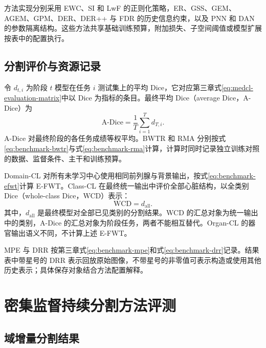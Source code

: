 方法实现分别采用 EWC、SI 和 LwF 的正则化策略\cite{kirkpatrick2017ewc,method_regu_si,li2018lwf}，ER、GSS、GEM、AGEM、GPM、DER、DER++ 与 FDR 的历史信息约束\cite{method_replay_er,method_replay_gss,method_replay_gem,method_replay_agem,saha2021gpm,method_replay_der,method_replay_xder,method_replay_fdr}，以及 PNN 和 DAN 的参数隔离结构\cite{method_dyn_pnn,method_dyn_dan}。这些方法共享基础训练预算，附加损失、子空间阈值或模型扩展按表中的配置执行。

\subsection{分割评价与资源记录}
\label{subsec:segmentation-benchmark-evaluation}

令 $d_{t,i}$ 为阶段 $t$ 模型在任务 $i$ 测试集上的平均 Dice，它对应第三章式\eqref{eq:medcl-evaluation-matrix}中以 Dice 为指标的条目。最终平均 Dice（average Dice，A-Dice）为
\begin{equation}
\mathrm{A\mbox{-}Dice}
=
\frac{1}{T}\sum_{i=1}^{T}d_{T,i}.
\label{eq:benchmark-adice}
\end{equation}
A-Dice 对最终阶段的各任务成绩等权平均。BWTR 和 RMA 分别按式\eqref{eq:benchmark-bwtr}与式\eqref{eq:benchmark-rma}计算，计算时同时记录独立训练对照的数据、监督条件、主干和训练预算。

Domain-CL 对所有未学习中心使用相同前列腺与背景输出，按式\eqref{eq:benchmark-efwt}计算 E-FWT。Class-CL 在最终统一输出中评价全部心脏结构，以全类别 Dice（whole-class Dice，WCD）表示：
\begin{equation}
\mathrm{WCD}=d_{\mathrm{all}}.
\label{eq:benchmark-wcd}
\end{equation}
其中，$d_{\mathrm{all}}$ 是最终模型对全部已见类别的分割结果。WCD 的汇总对象为统一输出中的类别，A-Dice 的汇总对象为阶段任务，两者不能相互替代。Organ-CL 的器官输出语义不同，不计算上述 E-FWT。

MPE 与 DRR 按第三章式\eqref{eq:benchmark-mpe}和式\eqref{eq:benchmark-drr}记录。结果表中带星号的 DRR 表示回放原始图像，不带星号的非零值可表示构造或使用其他历史表示；具体保存对象结合方法配置解释。

\section{密集监督持续分割方法评测}
\label{sec:benchmark-results}

\subsection{域增量分割结果}

